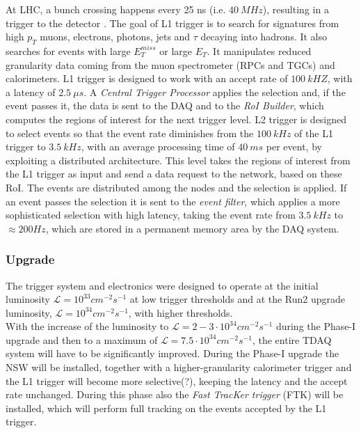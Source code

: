 \documentclass[a4paper,twoside,12pt]{article}
\begin{document}
At LHC, a bunch crossing happens every 25 ns (i.e. $40\ MHz$), resulting in a trigger to the detector . The goal of L1 trigger is to search for signatures from high $p_{T}$ muons, electrons,
photons, jets and $\tau$ decaying into hadrons. It also searches for events with large $E_{T}^{miss}$ or large $E_{T}$. It manipulates reduced granularity data coming from the muon
spectrometer (RPCs and TGCs) and calorimeters. L1 trigger is designed to work with an accept rate of $100\ kHZ$, with a latency of $2.5\ \mu s$. A \textit{Central Trigger Processor} applies
the selection and, if the event passes it, the data is
sent to the DAQ and to the \textit{RoI Builder}, which computes the regions of interest for the next trigger level.
L2 trigger is designed to select events so that the event rate diminishes from the $100\ kHz$ of the L1 trigger to $3.5\ kHz$, with an average processing time of $40\ ms$ per event, by
exploiting a distributed architecture. This
level takes the regions of interest from the L1 trigger as input and send a data request to the network, based on these RoI. The events are distributed among the nodes and the selection is applied. If an event passes the selection it is sent to the \textit{event filter}, which applies a more sophisticated selection with high latency, taking the event rate from $3.5\ kHz$ to $\approx 200 Hz$, which are stored in a permanent memory area by the DAQ system.

\subsubsection{Upgrade}
The trigger system and electronics were designed to operate at the initial luminosity 
$\mathcal{L} = 10^{33} cm^{-2}s^{-1}$ at low trigger thresholds and at the Run2 upgrade
luminosity, $\mathcal{L} = 10^{34} cm^{-2}s^{-1}$, with higher thresholds\cite{scoping}.\\

With the increase of the luminosity to $\mathcal{L} = 2-3 \cdot 10^{34} cm^{-2}s^{-1}$ during
the Phase-I upgrade and then to a maximum of $\mathcal{L} = 7.5 \cdot 10^{34} cm^{-2}s^{-1}$, the entire TDAQ system will have to be significantly improved. During the Phase-I upgrade the NSW will be installed, together with a higher-granularity calorimeter
trigger and the L1 trigger will become more selective(?), keeping the latency and the accept rate unchanged. During this phase also the \textit{Fast TracKer trigger} (FTK)\cite{FTK_TDR} will be installed, which will perform
full tracking on the events accepted by the L1 trigger. \\
\end{document}
